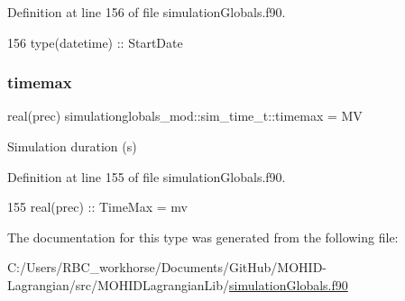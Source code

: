 Definition at line 156 of file simulation\+Globals.\+f90.


\begin{DoxyCode}
156         \textcolor{keywordtype}{type}(datetime)  :: StartDate
\end{DoxyCode}
\mbox{\label{structsimulationglobals__mod_1_1sim__time__t_ae84053cfbfb0b731cbf15e7334f223cd}} 
\subsubsection{\texorpdfstring{timemax}{timemax}}
{\footnotesize\ttfamily real(prec) simulationglobals\+\_\+mod\+::sim\+\_\+time\+\_\+t\+::timemax = MV\hspace{0.3cm}{\ttfamily [private]}}



Simulation duration (s) 



Definition at line 155 of file simulation\+Globals.\+f90.


\begin{DoxyCode}
155         \textcolor{keywordtype}{real(prec)}      :: TimeMax = mv              
\end{DoxyCode}


The documentation for this type was generated from the following file\+:\begin{DoxyCompactItemize}
\item 
C\+:/\+Users/\+R\+B\+C\+\_\+workhorse/\+Documents/\+Git\+Hub/\+M\+O\+H\+I\+D-\/\+Lagrangian/src/\+M\+O\+H\+I\+D\+Lagrangian\+Lib/\mbox{\hyperlink{simulation_globals_8f90}{simulation\+Globals.\+f90}}\end{DoxyCompactItemize}
